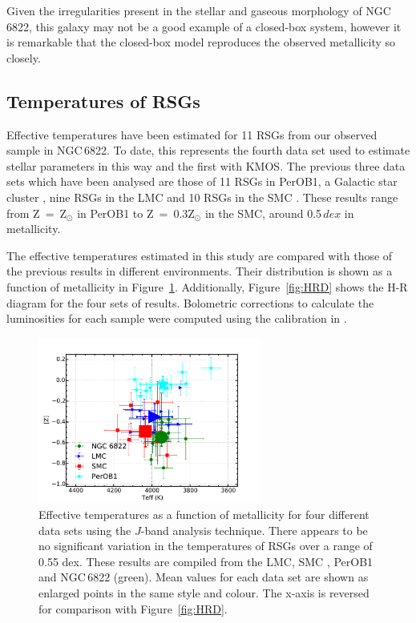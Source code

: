 Given the irregularities present in the stellar and gaseous morphology of NGC\,6822, this galaxy may not be a good example of a closed-box system, however it is remarkable that the closed-box model reproduces the observed metallicity so closely.


\subsection{Temperatures of RSGs} %
\label{sub:temperatures_of_rsgs}

Effective temperatures have been estimated for 11 RSGs from our observed sample in NGC\,6822.
To date, this represents the fourth data set used to estimate stellar parameters in this way and the first with KMOS.
The previous three data sets which have been analysed are those of 11 RSGs in PerOB1,
a Galactic star cluster
\citep{2014ApJ...788...58G}, nine RSGs in the LMC and 10 RSGs in the SMC
\citep[both from][]{2015ApJ...806...21D}.
These results range from Z~=~Z$_{\odot}$ in PerOB1 to Z~=~0.3Z$_{\odot}$ in the SMC, around 0.5\,$dex$ in metallicity.

The effective temperatures estimated in this study are compared with those of the previous results in different environments.
Their distribution is shown as a function of metallicity in Figure~\ref{fig:TvsZ}.
Additionally, Figure~\ref{fig:HRD} shows the H-R diagram for the four sets of results.
Bolometric corrections to calculate the luminosities for each sample were computed using the calibration in
\cite{2013ApJ...767....3D}.


\begin{figure}
 \centering
\includegraphics[width=0.65\textwidth]{ngc6822/N6822_TeffvsZ-thesis}
\caption[Effective temperature as a function of metallicity from four different environments]{
Effective temperatures as a function of metallicity for four different data sets using the $J$-band analysis technique.
There appears to be no significant variation in the temperatures of RSGs over a range of 0.55 dex.
These results are compiled from the LMC, SMC
\protect\citep[blue and red points respectively;][]{2015ApJ...806...21D}, PerOB1
\protect\citep[a Galactic RSG cluster; cyan;][]{2014ApJ...788...58G} and NGC\,6822 (green).
Mean values for each data set are shown as enlarged points in the same style and colour.
The x-axis is reversed for comparison with Figure~\ref{fig:HRD}.\label{fig:TvsZ}
         }
\end{figure}

